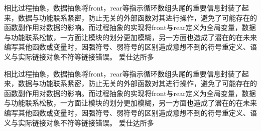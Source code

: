 \documentclass[UTF8]{ctexart}
\begin{document}
    相比过程抽象，数据抽象将front，rear等指示循环数组头尾的重要信息封装了起来，数据与功能联系紧密，防止无关的外部函数对其进行操作，避免了可能存在的函数副作用对数据的影响。而过程抽象的实现将front与rear定义为全局变量，数据与功能联系松散，一方面让模块的划分更加模糊，另一方面也造成了潜在的在未来编写其他函数或变量时，因强符号、弱符号的区别造成意想不到的符号重定义、语义与实际链接对象不符等链接错误。
    爱仕达所多

    相比过程抽象，数据抽象将front，rear等指示循环数组头尾的重要信息封装了起来，数据与功能联系紧密，防止无关的外部函数对其进行操作，避免了可能存在的函数副作用对数据的影响。而过程抽象的实现将front与rear定义为全局变量，数据与功能联系松散，一方面让模块的划分更加模糊，另一方面也造成了潜在的在未来编写其他函数或变量时，因强符号、弱符号的区别造成意想不到的符号重定义、语义与实际链接对象不符等链接错误。
    爱仕达所多
\end{document}
